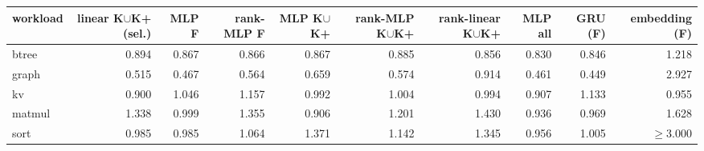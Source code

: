 \begin{tabular}{lrrrrrrrrr}
\toprule
workload & linear K$\cup$K{+} (sel.) & MLP F & rank-MLP F & MLP K$\cup$K{+} & rank-MLP K$\cup$K{+} & rank-linear K$\cup$K{+} & MLP all & GRU (F) & embedding (F) \\
\midrule
btree & 0.894 & 0.867 & 0.866 & 0.867 & 0.885 & 0.856 & 0.830 & 0.846 & 1.218 \\
graph & 0.515 & 0.467 & 0.564 & 0.659 & 0.574 & 0.914 & 0.461 & 0.449 & 2.927 \\
kv & 0.900 & 1.046 & 1.157 & 0.992 & 1.004 & 0.994 & 0.907 & 1.133 & 0.955 \\
matmul & 1.338 & 0.999 & 1.355 & 0.906 & 1.201 & 1.430 & 0.936 & 0.969 & 1.628 \\
sort & 0.985 & 0.985 & 1.064 & 1.371 & 1.142 & 1.345 & 0.956 & 1.005 & $\geq$3.000 \\
\bottomrule
\end{tabular}

